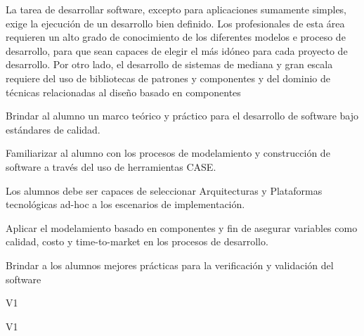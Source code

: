 \begin{syllabus}


\begin{justification}
La tarea de desarrollar software, excepto para aplicaciones sumamente simples, exige la ejecución de un desarrollo bien definido. Los profesionales de esta área requieren un alto grado de conocimiento de los diferentes modelos e proceso de desarrollo, para que sean capaces de elegir el más idóneo para cada proyecto de desarrollo. Por otro lado, el desarrollo de sistemas de mediana y gran escala requiere del uso de bibliotecas de patrones y componentes y del dominio de técnicas relacionadas al diseño basado en componentes
\end{justification}

\begin{goals}
\item Brindar al alumno un marco teórico y práctico para el desarrollo de software bajo estándares de calidad.
\item Familiarizar al alumno con los procesos de modelamiento y construcción de software a través del uso de herramientas CASE.
\item Los alumnos debe ser capaces de seleccionar Arquitecturas y Plataformas tecnológicas ad-hoc a los escenarios de implementación.
\item Aplicar el modelamiento basado en componentes y fin de asegurar variables como calidad, costo y time-to-market en los procesos de desarrollo.
\item Brindar a los alumnos mejores prácticas para la verificación y validación del software
\end{goals}

\begin{outcomes}{V1}
    \item {}
    \item {}
	\item {}
	\item {}
	\item {}
\end{outcomes}

\begin{competences}{V1}
    \item {} 
    \item {} 
    \item {}
	\item {}
	\item {}
	\item {}
	\item {}
	\item {}
	\item {}
	\item {}
	\item {}
\end{competences}


\end{syllabus}
